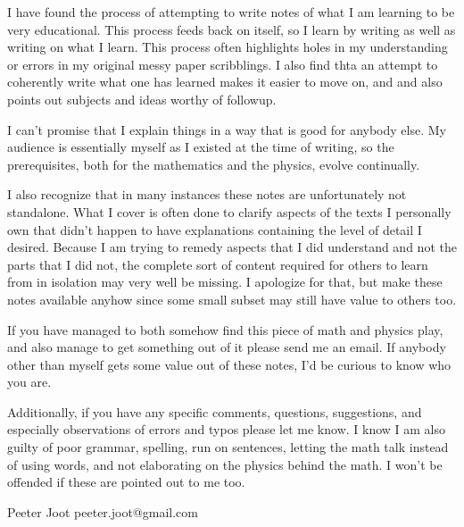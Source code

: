 I have found the process of attempting to write notes of what I am learning to be very educational.  This process feeds back on itself, so I learn by writing as well as writing on what I learn.  This process often highlights holes in my understanding or errors in my original messy paper scribblings.  I also find thta an attempt to coherently write what one has learned makes it easier to move on, and and also points out subjects and ideas worthy of followup.

I can't promise that I explain things in a way that is good for anybody else.  My audience is essentially myself as I existed at the time of writing, so the prerequisites, both for the mathematics and the physics, evolve continually. 

I also recognize that in many instances these notes are unfortunately not standalone.  What I cover is often done to clarify aspects of the texts I personally own that didn't happen to have explanations containing the level of detail I desired.  Because I am trying to remedy aspects that I did understand and not the parts that I did not, the complete sort of content required for others to learn from in isolation may very well be missing.  I apologize for that, but make these notes available anyhow since some small subset may still have value to others too.

If you have managed to both somehow find this piece of math and physics play, and also manage to get something out of it please send me an email.  If anybody other than myself gets some value out of these notes, I'd be curious to know who you are.

Additionally, if you have any specific comments, questions, suggestions, and especially observations of errors and typos please let me know.  I know I am also guilty of poor grammar, spelling, run on sentences, letting the math talk instead of using words, and not elaborating on the physics behind the math.  I won't be offended if these are pointed out to me too.

Peeter Joot  \quad peeter.joot@gmail.com 
